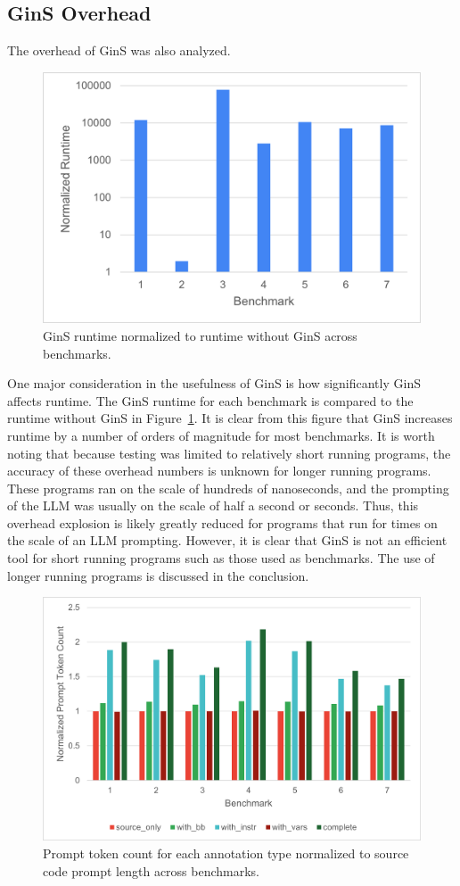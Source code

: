 \documentclass[sigconf]{acmart}
\begin{document}
\subsection{GinS Overhead}
The overhead of GinS was also analyzed.
\begin{figure}
    \centering
    \includegraphics[width=0.8\linewidth]{images/Time.png}
    \caption{GinS runtime normalized to runtime without GinS across benchmarks.}
    \label{fig:time}
\end{figure}

One major consideration in the usefulness of GinS is how significantly GinS affects runtime.
The GinS runtime for each benchmark is compared to the runtime without GinS in Figure~\ref{fig:time}.
It is clear from this figure that GinS increases runtime by a number of orders of magnitude for most benchmarks.
It is worth noting that because testing was limited to relatively short running programs, the accuracy of these overhead numbers is unknown for longer running programs.
These programs ran on the scale of hundreds of nanoseconds, and the prompting of the LLM was usually on the scale of half a second or seconds.
Thus, this overhead explosion is likely greatly reduced for programs that run for times on the scale of an LLM prompting.
However, it is clear that GinS is not an efficient tool for short running programs such as those used as benchmarks.
The use of longer running programs is discussed in the conclusion.

\begin{figure}
    \centering
    \includegraphics[width=1\linewidth]{images/PromptCost.png}
    \caption{Prompt token count for each annotation type normalized to source code prompt length across benchmarks.}
    \label{fig:prompt}
\end{figure}
\end{document}
